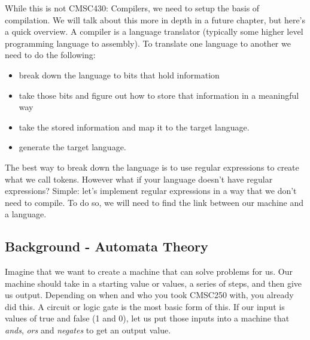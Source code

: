 \documentclass[main.tex]{subfiles}
\begin{document}
While this is not CMSC430: Compilers, we need to setup the basis of compilation. We will talk about this more in depth in a future chapter, but here's a quick overview. A compiler is a language translator (typically some higher level programming language to assembly). To translate one language to another we need to do the following:
\begin{itemize}
    \item break down the language to bits that hold information
    \item take those bits and figure out how to store that information in a meaningful way
    \item take the stored information and map it to the target language. 
    \item generate the target language. 
\end{itemize}

The best way to break down the language is to use regular expressions to create what we call tokens. However what if your language doesn't have regular expressions? Simple: let's implement regular expressions in a way that we don't need to compile. To do so, we will need to find the link between our machine and a language. 

\subsection{Background - Automata Theory}
Imagine that we want to create a machine that can solve problems for us. Our machine should take in a starting value or values, a series of steps, and then give us output. Depending on when and who you took CMSC250 with, you already did this. A circuit or logic gate is the most basic form of this. If our input is values of true and false (1 and 0), let us put those inputs into a machine that \textit{ands}, \textit{ors} and \textit{negates} to get an output value. 
\end{document}
